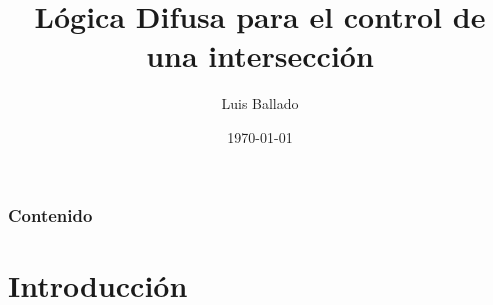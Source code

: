 \documentclass[
	11pt, %
]{beamer}
\title[Inteligencia Computacional]{Lógica Difusa para el control de una intersección} %
\author[Luis Ballado]{Luis Ballado} %
\institute[CINVESTAV]{CINVESTAV - UNIDAD TAMAULIPAS \\ \smallskip \textit{luis.ballado@cinvestav.mx}} %
\date[\today]{\today} %
\begin{document}

\begin{frame}
	\titlepage %
\end{frame}



\begin{frame}
	\frametitle{Contenido} %
	
	\tableofcontents %
\end{frame}


\section{Introducción} %
\end{document}
